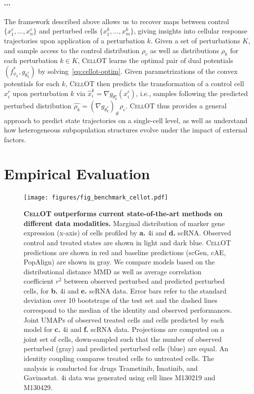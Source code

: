 \paragraph{...}
The framework described above allows us to recover maps between control $\{ x_1^c, \dots, x_n^c \}$ and perturbed cells $\{ x_1^k, \dots, x_m^k \}$, giving insights into cellular response trajectories upon application of a perturbation $k$.
Given a set of perturbations $K$, and sample access to the control distribution $\rho_c$ as well as  distributions $\rho_k$ for each perturbation $k \in K$, \textsc{CellOT} learns the optimal pair of dual potentials $(f_{\phi_k}^*, g_{\theta_k^*})$ by solving~\eqref{eq:cellot-optim}.
Given parametrizations of the convex potentials for each $k$, \textsc{CellOT} then predicts the transformation of a control cell $x_i^c$ upon perturbation $k$ via $\hat{x}_i^k = \nabla g_{\theta_k^\star}(x_i^c)$, i.e., samples following the predicted perturbed distribution $\hat{\rho_k} =(\nabla g_{\theta_k^*})_{\#} \rho_{c}$. 
\textsc{CellOT} thus provides a general approach to predict state trajectories on a single-cell level,
as well as understand how heterogeneous subpopulation structures evolve under the impact of external factors.



\section{Empirical Evaluation}

\begin{figure}
    \centering
    \texttt{[image: figures/fig\_benchmark\_cellot.pdf]}
    \caption{ \textbf{\textsc{CellOT} outperforms current state-of-the-art methods on different data modalities.}  Marginal distribution of marker gene expression (x-axis) of cells profiled by \textbf{a.} 4i and \textbf{d.} scRNA. Observed control and treated states are shown in light and dark blue. \textsc{CellOT} predictions are shown in red and baseline predictions (scGen, cAE, PopAlign) are shown in gray. We compare models based on the distributional distance MMD as well as average correlation coefficient $r^2$ between observed perturbed and predicted perturbed cells, for \textbf{b.} 4i and \textbf{e.} scRNA data. Error bars refer to the standard deviation over 10 bootstraps of the test set and the dashed lines correspond to the median of the identity and observed performances. Joint UMAPs of observed treated cells and cells predicted by each model for \textbf{c.} 4i and \textbf{f.} scRNA data. Projections are computed on a joint set of cells, down-sampled such that the number of observed perturbed (gray) and predicted perturbed cells (blue) are equal. An identity coupling compares treated cells to untreated cells. The analysis is conducted for drugs Trametinib, Imatinib, and Gavinostat. 4i data was generated using cell lines M130219 and M130429.}
    \label{fig:benchmark_cellot}
\end{figure}

